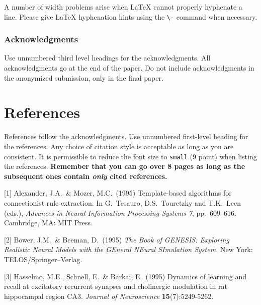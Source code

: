 \documentclass{article}
\begin{document}
A number of width problems arise when \LaTeX{} cannot properly
hyphenate a line. Please give LaTeX hyphenation hints using the
\verb+\-+ command when necessary.

\subsubsection*{Acknowledgments}

Use unnumbered third level headings for the acknowledgments. All
acknowledgments go at the end of the paper. Do not include
acknowledgments in the anonymized submission, only in the final paper.

\section*{References}

References follow the acknowledgments. Use unnumbered first-level
heading for the references. Any choice of citation style is acceptable
as long as you are consistent. It is permissible to reduce the font
size to \verb+small+ (9 point) when listing the references. {\bf
  Remember that you can go over 8 pages as long as the subsequent ones contain
  \emph{only} cited references.}
\medskip

\small

[1] Alexander, J.A.\ \& Mozer, M.C.\ (1995) Template-based algorithms
for connectionist rule extraction. In G.\ Tesauro, D.S.\ Touretzky and
T.K.\ Leen (eds.), {\it Advances in Neural Information Processing
  Systems 7}, pp.\ 609--616. Cambridge, MA: MIT Press.

[2] Bower, J.M.\ \& Beeman, D.\ (1995) {\it The Book of GENESIS:
  Exploring Realistic Neural Models with the GEneral NEural SImulation
  System.}  New York: TELOS/Springer--Verlag.

[3] Hasselmo, M.E., Schnell, E.\ \& Barkai, E.\ (1995) Dynamics of
learning and recall at excitatory recurrent synapses and cholinergic
modulation in rat hippocampal region CA3. {\it Journal of
  Neuroscience} {\bf 15}(7):5249-5262.
\end{document}
